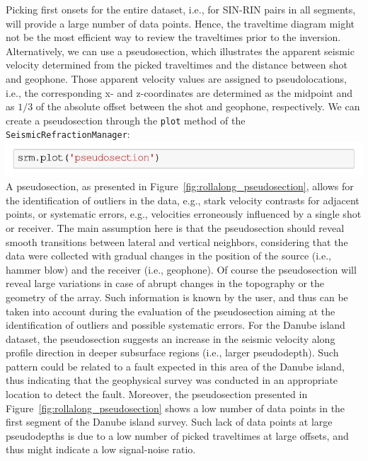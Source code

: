 \documentclass[a4paper,fleqn]{cas-sc}
\begin{document}
Picking first onsets for the entire dataset, i.e., for SIN-RIN pairs in all segments, will provide a large number of data points. Hence, the traveltime diagram might not be the most efficient way to review the traveltimes prior to the inversion. Alternatively, we can use a pseudosection, which illustrates the apparent seismic velocity determined from the picked traveltimes and the distance between shot and geophone. Those apparent velocity values are assigned to pseudolocations, i.e., the corresponding x- and z-coordinates are determined as the midpoint and as $1/3$ of the absolute offset between the shot and geophone, respectively.
We can create a pseudosection through the \texttt{plot} method of the \texttt{SeismicRefractionManager}:
\newline
\includegraphics[width=.5\textwidth]{./figures/plotpseudosection_danube.pdf}
\newline
A pseudosection, as presented in Figure~\ref{fig:rollalong_pseudosection}, allows for the identification of outliers in the data, e.g., stark velocity contrasts for adjacent points, or systematic errors, e.g., velocities erroneously influenced by a single shot or receiver. The main assumption here is that the pseudosection should reveal smooth transitions between lateral and vertical neighbors, considering that the data were collected with gradual changes in the position of the source (i.e., hammer blow) and the receiver (i.e., geophone). Of course the pseudosection will reveal large variations in case of abrupt changes in the topography or the geometry of the array. Such information is known by the user, and thus can be taken into account during the evaluation of the pseudosection aiming at the identification of outliers and possible systematic errors.
For the Danube island dataset, the pseudosection suggests an increase in the seismic velocity along profile direction in deeper subsurface regions (i.e., larger pseudodepth). Such pattern could be related to a fault expected in this area of the Danube island, thus indicating that the geophysical survey was conducted in an appropriate location to detect the fault.
Moreover, the pseudosection presented in Figure~\ref{fig:rollalong_pseudosection} shows a low number of data points in the first segment of the Danube island survey. Such lack of data points at large pseudodepths is due to a low number of picked traveltimes at large offsets, and thus might indicate a low signal-noise ratio.
\end{document}
